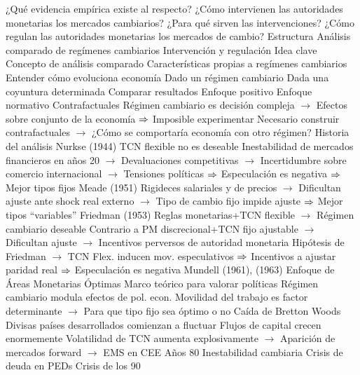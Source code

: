 \documentclass{nuevotema}
\begin{document}
\begin{esquemal}
			\3 ¿Qué evidencia empírica existe al respecto?
			\3 ¿Cómo intervienen las autoridades monetarias los mercados cambiarios?
			\3 ¿Para qué sirven las intervenciones?
			\3 ¿Cómo regulan las autoridades monetarias los mercados de cambio?
		\2 Estructura
			\3 Análisis comparado de regímenes cambiarios
			\3 Intervención y regulación
	\1 
		\2 Idea clave
			\3 Concepto de análisis comparado
				\4 Características propias a regímenes cambiarios
				\4 Entender cómo evoluciona economía
				\4[] Dado un régimen cambiario
				\4[] Dada una coyuntura determinada
				\4 Comparar resultados
				\4[] Enfoque positivo
				\4[] Enfoque normativo
				\4 Contrafactuales
				\4[] Régimen cambiario es decisión compleja
				\4[] $\to$ Efectos sobre conjunto de la economía
				\4[] $\Rightarrow$ Imposible experimentar
				\4[] Necesario construir contrafactuales
				\4[] $\to$ ¿Cómo se comportaría economía con otro régimen?
			\3 Historia del análisis
				\4 Nurkse (1944)
				\4[] TCN flexible no es deseable
				\4[] Inestabilidad de mercados financieros en años 20
				\4[] $\to$ Devaluaciones competitivas
				\4[] $\to$ Incertidumbre sobre comercio internacional
				\4[] $\to$ Tensiones políticas
				\4[] $\Rightarrow$ Especulación es negativa
				\4[] $\Rightarrow$ Mejor tipos fijos
				\4 Meade (1951)
				\4[] Rigideces salariales y de precios
				\4[] $\to$ Dificultan ajuste ante shock real externo
				\4[] $\to$ Tipo de cambio fijo impide ajuste
				\4[] $\Rightarrow$ Mejor tipos ``variables''
				\4 Friedman (1953)
				\4[] Reglas monetarias+TCN flexible
				\4[] $\to$ Régimen cambiario deseable
				\4[] Contrario a PM discrecional+TCN fijo ajustable
				\4[] $\to$ Dificultan ajuste
				\4[] $\to$ Incentivos perversos de autoridad monetaria
				\4[] Hipótesis de Friedman
				\4[] $\to$ TCN Flex. inducen mov. especulativos 
				\4[] $\Rightarrow$ Incentivos a ajustar paridad real
				\4[] $\Rightarrow$ Especulación es negativa
				\4 Mundell (1961), (1963)
				\4[] Enfoque de Áreas Monetarias Óptimas
				\4[] Marco teórico para valorar políticas
				\4[] Régimen cambiario modula efectos de pol. econ.
				\4[] Movilidad del trabajo es factor determinante
				\4[] $\to$ Para que tipo fijo sea óptimo o no
				\4 Caída de Bretton Woods
				\4[] Divisas países desarrollados comienzan a fluctuar
				\4[] Flujos de capital crecen enormemente
				\4[] Volatilidad de TCN aumenta explosivamente
				\4[] $\to$ Aparición de mercados forward
				\4[] $\to$ EMS en CEE
				\4 Años 80
				\4[] Inestabilidad cambiaria
				\4[] Crisis de deuda en PEDs
				\4 Crisis de los 90

\end{esquemal}
\end{document}
